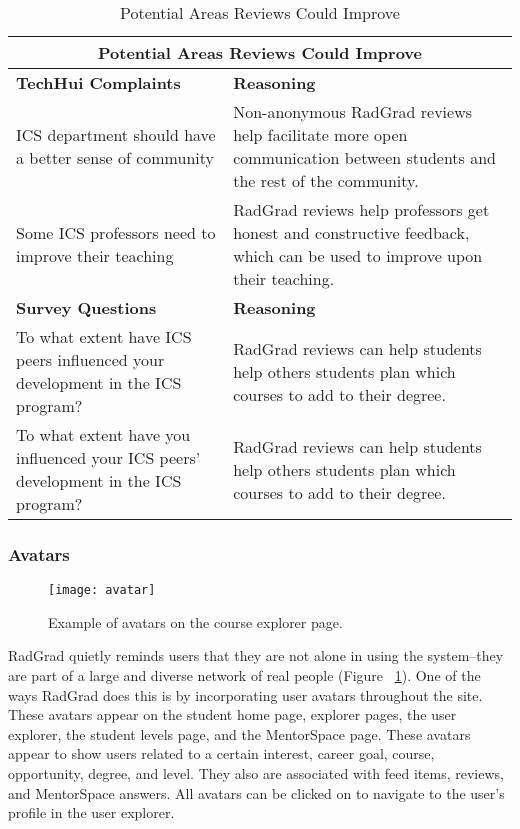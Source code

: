\begin{table}[htbp!]
\centering
\begin{tabular}{  |p{4cm}|p{12cm}| } 
\hline
 \multicolumn{2}{|c|}{Potential Areas Reviews Could Improve}\\
  \hline
 \textbf{TechHui Complaints} & \textbf{Reasoning} \\ 
  \hline
  ICS department should have a better sense of community & Non-anonymous RadGrad reviews help facilitate more open communication between students and the rest of the community.\\
  \hline
    Some ICS professors need to improve their teaching & RadGrad reviews help professors get honest and constructive feedback, which can be used to improve upon their teaching.\\
  \hline
 \textbf{Survey Questions} & \textbf{Reasoning} \\ 
  \hline
    To what extent have ICS peers influenced your development in the ICS program? & RadGrad reviews can help students help others students plan which courses to add to their degree. \\
      \hline
    To what extent have you influenced your ICS peers' development in the ICS program? & RadGrad reviews can help students help others students plan which courses to add to their degree. \\
  \hline
\end{tabular}
 \caption{Potential Areas Reviews Could Improve}
\end{table}

\subsubsection{Avatars}

\begin{figure}[htbp!]
\centering
\texttt{[image: avatar]}
\caption{Example of avatars on the course explorer page.}
\label{course-explorer-avatars}
\end{figure}
RadGrad quietly reminds users that they are not alone in using the system--they are part of a large and diverse network of real people (Figure ~\ref{course-explorer-avatars}). One of the ways RadGrad does this is by incorporating user avatars throughout the site. These avatars appear on the student home page, explorer pages, the user explorer, the student levels page, and the MentorSpace page. These avatars appear to show users related to a certain interest, career goal, course, opportunity, degree, and level. They also are associated with feed items, reviews, and MentorSpace answers. All avatars can be clicked on to navigate to the user's profile in the user explorer.  

